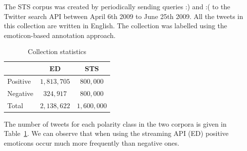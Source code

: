 \documentclass{sig-alternate}
\begin{document}
The STS corpus was created by periodically sending queries :) and :( to the Twitter search API between April 6th 2009 to June 25th 2009. All the tweets in this collection are written in English. The collection was labelled using the emoticon-based annotation approach.




\begin{table}[htbp]
\begin{center}
\begin{tabular}{l|c|c}
\hline
 & ED & STS \\ \hline
Positive & $1,813,705$ & $800,000$  \\ 
Negative & $324,917$ & $800,000$  \\ \hline
Total & $2,138,622$ & $1,600,000$ \\ 
\end{tabular}
\end{center}
\caption{Collection statistics}
\label{tab:colstats}
\end{table}


The number of tweets for each polarity class in the two corpora is given in Table~\ref{tab:colstats}. We can observe that when using the streaming API (ED) positive emoticons occur much more frequently than negative ones.
\end{document}
